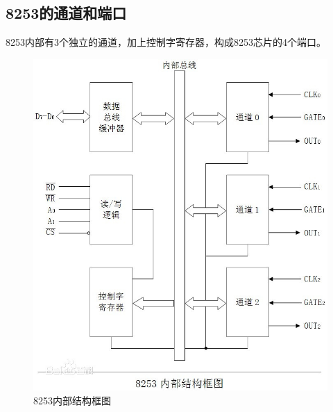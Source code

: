\documentclass[12pt]{article}
\begin{document}
\begin{list}{•}{•}
\section{8253的通道和端口}
8253内部有3个独立的通道，加上控制字寄存器，构成8253芯片的4个端口。
\begin{figure}[htbp]
\centering
\includegraphics[scale=0.4]{fig/27.jpeg}
\caption{8253内部结构框图}
\label{fig:Intel 8253 inner structure}
\end{figure}


\end{list}
\end{document}

